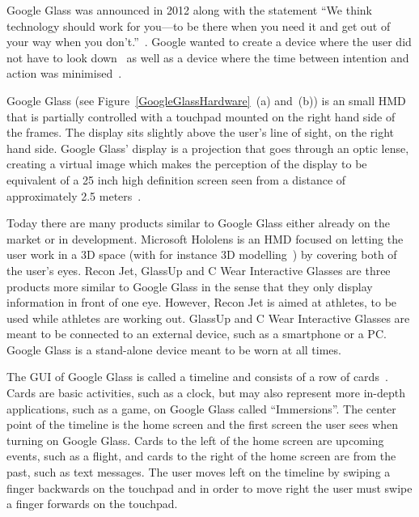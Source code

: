 Google Glass was announced in 2012 along with the statement ``We think technology should work for you---to be there when you need it and get out of your way when you don't.''~\cite{GoogleGlassAnnouncement}. Google wanted to create a device where the user did not have to look down~\cite{tedtalkWhyGlass} as well as a device where the time between intention and action was minimised~\cite{6504855}. 

Google Glass (see Figure~\ref{GoogleGlassHardware}~(a) and~(b)) is an small HMD that is partially controlled with a touchpad mounted on the right hand side of the frames. The display sits slightly above the user's line of sight, on the right hand side. Google Glass' display is a projection that goes through an optic lense, creating a virtual image which makes the perception of the display to be equivalent of a 25 inch high definition screen seen from a distance of approximately 2.5 meters~\cite{GlassSpecs}.

Today there are many products similar to Google Glass either already on the market or in development. Microsoft Hololens is an HMD focused on letting the user work in a 3D space (with for instance 3D modelling~\cite{hololensDemo}) by covering both of the user's eyes. Recon Jet, GlassUp and C Wear Interactive Glasses are three products more similar to Google Glass in the sense that they only display information in front of one eye. However, Recon Jet is aimed at athletes, to be used while athletes are working out. GlassUp and C Wear Interactive Glasses are meant to be connected to an external device, such as a smartphone or a PC. Google Glass is a stand-alone device meant to be worn at all times.

The GUI of Google Glass is called a timeline and consists of a row of cards~\cite{ImagesGoogleGlassUI}. Cards are basic activities, such as a clock, but may also represent more in-depth applications, such as a game, on Google Glass called ``Immersions''. The center point of the timeline is the home screen and the first screen the user sees when turning on Google Glass. Cards to the left of the home screen are upcoming events, such as a flight, and cards to the right of the home screen are from the past, such as text messages. The user moves left on the timeline by swiping a finger backwards on the touchpad and in order to move right the user must swipe a finger forwards on the touchpad. 

